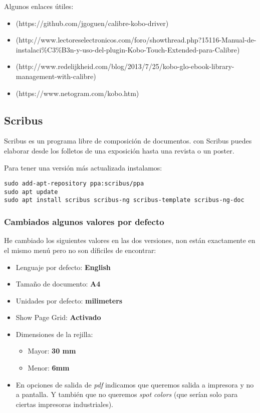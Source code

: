 \documentclass[
  12pt,
  spanish,
]{article}
\providecommand{\tightlist}{%
  \setlength{\itemsep}{0pt}\setlength{\parskip}{0pt}}
\begin{document}
Algunos enlaces útiles:

\begin{itemize}
\tightlist
\item
  (https://github.com/jgoguen/calibre-kobo-driver)
\item
  (http://www.lectoreselectronicos.com/foro/showthread.php?15116-Manual-de-instalaci\%C3\%B3n-y-uso-del-plugin-Kobo-Touch-Extended-para-Calibre)
\item
  (http://www.redelijkheid.com/blog/2013/7/25/kobo-glo-ebook-library-management-with-calibre)
\item
  (https://www.netogram.com/kobo.htm)
\end{itemize}

\hypertarget{scribus}{%
\subsection{Scribus}\label{scribus}}

Scribus es un programa libre de composición de documentos. con Scribus
puedes elaborar desde los folletos de una exposición hasta una revista o
un poster.

Para tener una versión más actualizada instalamos:

\begin{verbatim}
sudo add-apt-repository ppa:scribus/ppa
sudo apt update
sudo apt install scribus scribus-ng scribus-template scribus-ng-doc
\end{verbatim}

\hypertarget{cambiados-algunos-valores-por-defecto}{%
\subsubsection{Cambiados algunos valores por
defecto}\label{cambiados-algunos-valores-por-defecto}}

He cambiado los siguientes valores en las dos versiones, non están
exactamente en el mismo menú pero no son díficiles de encontrar:

\begin{itemize}
\tightlist
\item
  Lenguaje por defecto: \textbf{English}
\item
  Tamaño de documento: \textbf{A4}
\item
  Unidades por defecto: \textbf{milimeters}
\item
  Show Page Grid: \textbf{Activado}
\item
  Dimensiones de la rejilla:

  \begin{itemize}
  \tightlist
  \item
    Mayor: \textbf{30 mm}
  \item
    Menor: \textbf{6mm}
  \end{itemize}
\item
  En opciones de salida de \emph{pdf} indicamos que queremos salida a
  impresora y no a pantalla. Y también que no queremos \emph{spot
  colors} (que serían solo para ciertas impresoras industriales).
\end{itemize}
\end{document}
